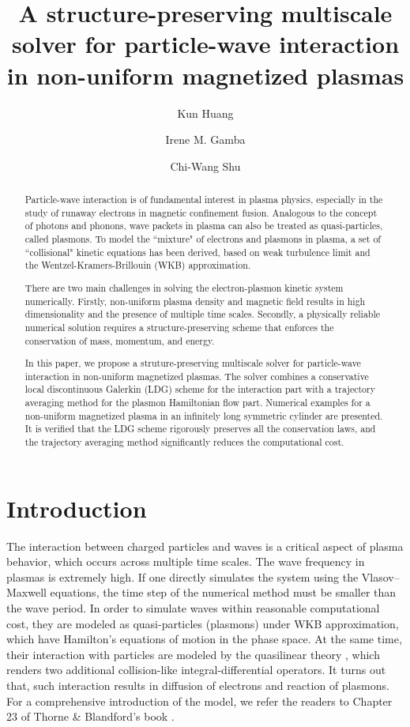 \documentclass{article}
\title{A structure-preserving multiscale solver for particle-wave interaction in non-uniform magnetized plasmas}
\author[*]{Kun Huang}
\author[$\dag$]{Irene M. Gamba}
\author[$\ddag$]{Chi-Wang Shu}
\affil[*]{Institute for Fusion Studies, University of Texas at Austin}
\affil[$\dag$]{Oden Institute for Computational Sciences and Engineering, University of Texas at Austin}
\affil[$\ddag$]{Division of Applied Mathematics, Brown University}
\date{}
\numberwithin{equation}{section}
\begin{document}
\maketitle

\begin{abstract}
    Particle-wave interaction is of fundamental interest in plasma physics, especially in the study of runaway electrons in magnetic confinement fusion. Analogous to the concept of photons and phonons, wave packets in plasma can also be treated as quasi-particles, called plasmons. To model the ``mixture" of electrons and plasmons in plasma, a set of ``collisional" kinetic equations has been derived, based on weak turbulence limit and the Wentzel-Kramers-Brillouin (WKB) approximation.

    There are two main challenges in solving the electron-plasmon kinetic system numerically. Firstly, non-uniform plasma density and magnetic field results in high dimensionality and the presence of multiple time scales. Secondly, a physically reliable numerical solution requires a structure-preserving scheme that enforces the conservation of mass, momentum, and energy.

    In this paper, we propose a struture-preserving multiscale solver for particle-wave interaction in non-uniform magnetized plasmas. The solver combines a conservative local discontinuous Galerkin (LDG) scheme for the interaction part with a trajectory averaging method for the plasmon Hamiltonian flow part. Numerical examples for a non-uniform magnetized plasma in an infinitely long symmetric cylinder are presented. It is verified that the LDG scheme rigorously preserves all the conservation laws, and the trajectory averaging method significantly reduces the computational cost.
\end{abstract}

\section{Introduction}\label{intro}
The interaction between charged particles and waves is a critical aspect of plasma behavior, which occurs across multiple time scales. The wave frequency in plasmas is extremely high. If one directly simulates the system using the Vlasov–Maxwell equations, the time step of the numerical method must be smaller than the wave period. In order to simulate waves within reasonable computational cost, they are modeled as quasi-particles (plasmons) under WKB approximation\cite{breizman_physics_2019}, which have Hamilton's equations of motion in the phase space. At the same time, their interaction with particles are modeled by the quasilinear theory \cite{vedenov1961nonlinear,drummond1962non, landau1946vibrations}, which renders two additional collision-like integral-differential operators. It turns out that, such interaction results in diffusion of electrons and reaction of plasmons. For a comprehensive introduction of the model, we refer the readers to Chapter 23 of Thorne \& Blandford's book \cite{thorne2017modern}.
\end{document}
